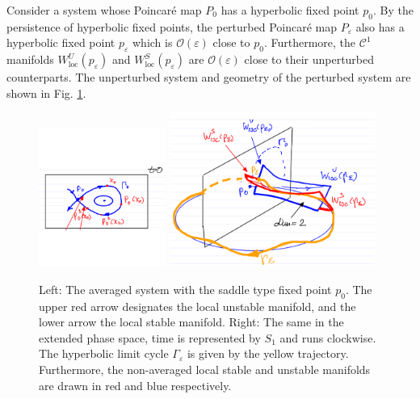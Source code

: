 \begin{ex}
	Consider a system whose Poincaré map $P_0$ has a hyperbolic fixed point $p_0$. By the persistence of hyperbolic fixed points, the perturbed Poincaré map $P_\varepsilon$ also has a hyperbolic fixed point $p_\varepsilon$ which is $\mathcal{O}(\varepsilon)$ close to $p_0$. Furthermore, the $\mathcal{C}^{1}$ manifolds $W^{U}_{ \textrm{loc} }(p_\varepsilon)$ and $W^{S}_{ \textrm{loc} }(p_{\varepsilon})$ are $\mathcal{O}(\varepsilon)$ close to their unperturbed counterparts. The unperturbed system and geometry of the perturbed system are shown in Fig. \ref{fig:avg_ex_2}.
	\begin{figure}[h!]
		\centering
		\includegraphics[width=0.37\textwidth]{figures/ch5/4avg_ex_2a.png}
		\includegraphics[width=0.6\textwidth]{figures/ch5/5avg_ex_2b.png}
		\caption{Left: The averaged system with the saddle type fixed point $p_0$. The upper red arrow designates the local unstable manifold, and the lower arrow the local stable manifold. Right: The same in the extended phase space, time is represented by $S_1$ and runs clockwise. The hyperbolic limit cycle $\Gamma_\varepsilon$ is given by the yellow trajectory. Furthermore, the non-averaged local stable and unstable manifolds are drawn in red and blue respectively.}
		\label{fig:avg_ex_2}
	\end{figure}
	
\end{ex}

